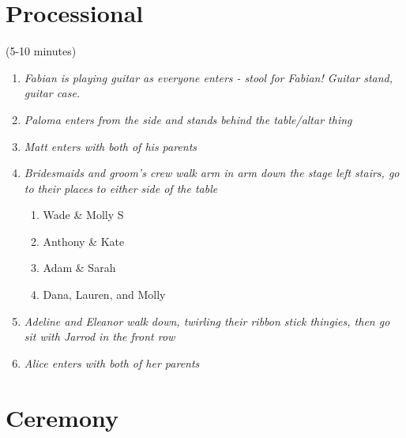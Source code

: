 \documentclass[12pt]{article}
\begin{document}
\section*{Processional} (5-10 minutes)

\begin{enumerate}
\item {\it Fabian is playing guitar as everyone enters - stool for Fabian! Guitar stand, guitar case.}
\item {\it Paloma enters from the side and stands behind the table/altar thing}
\item {\it Matt enters with both of his parents}
\item {\it Bridesmaids and groom's crew walk arm in arm down the stage left stairs, go to their places to either side of the table}

  \begin{enumerate}
  \item Wade \& Molly S
  \item Anthony \& Kate
  \item Adam \& Sarah
  \item Dana, Lauren, and Molly
  \end{enumerate}

\item {\it Adeline and Eleanor walk down, twirling their ribbon stick thingies, then go sit with Jarrod in the front row}
\item {\it Alice enters with both of her parents}
\end{enumerate}

\newpage

\section*{Ceremony}
\end{document}
